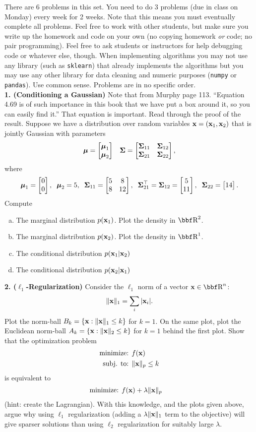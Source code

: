 \documentclass[12pt,letterpaper,fleqn]{hmcpset}
\begin{document}
There are 6 problems in this set. You need to do 3 problems (due in class on Monday)
every week for 2 weeks. Note that this means you must eventually complete all problems.
Feel free to work with other students, but make sure you write up the homework
and code on your own (no copying homework \textit{or} code; no pair programming).
Feel free to ask students or instructors for help debugging code or whatever else,
though.
When implementing algorithms you may not use any library (such as \texttt{sklearn})
that already implements the algorithms but you may use any other library for
data cleaning and numeric purposes (\texttt{numpy} or \texttt{pandas}). Use common
sense. Problems are in no specific order.\\[1em]

\textbf{1. (Conditioning a Gaussian)} Note that from Murphy page 113. ``Equation 4.69
is of such importance in this book that we have put a box around it, so you can easily
find it.'' That equation is important. Read through the proof of the result.
Suppose we have a distribution over random variables ${\bf x} = ({\bf x}_1, {\bf x}_2)$ that is
jointly Gaussian with parameters
\[
    \hbox{\boldmath$\mu$} = \begin{bmatrix} \hbox{\boldmath$\mu$}_1\\\hbox{\boldmath$\mu$}_2 \end{bmatrix}\;\;\; \hbox{\boldmath$\Sigma$} = \begin{bmatrix} \hbox{\boldmath$\Sigma$}_{11}&\hbox{\boldmath$\Sigma$}_{12}\\\hbox{\boldmath$\Sigma$}_{21}&\hbox{\boldmath$\Sigma$}_{22} \end{bmatrix},
\]
where
\[
    \hbox{\boldmath$\mu$}_1 = \begin{bmatrix} 0\\0 \end{bmatrix}, \;\; \hbox{\boldmath$\mu$}_2 = 5, \;\; \hbox{\boldmath$\Sigma$}_{11} = \begin{bmatrix} 5 & 8\\ 8 & 12 \end{bmatrix}, \;\; \hbox{\boldmath$\Sigma$}_{21}^\top = \hbox{\boldmath$\Sigma$}_{12} = \begin{bmatrix} 5\\11 \end{bmatrix}, \;\; \hbox{\boldmath$\Sigma$}_{22} = \begin{bmatrix} 14 \end{bmatrix}.
\]
Compute
\begin{enumerate}[(a)]
    \item The marginal distribution $p({\bf x}_1)$. Plot the density in $\RR^2$.
    \item The marginal distribution $p({\bf x}_2)$. Plot the density in $\RR^1$.
    \item The conditional distribution $p({\bf x}_1 | {\bf x}_2)$
    \item The conditional distribution $p({\bf x}_2 | {\bf x}_1)$\\[1em]
\end{enumerate}

\textbf{2. ($\ell_1$-Regularization)} Consider the $\ell_1$ norm of a vector $\xx\in\RR^n$:
\[
    \|{\bf x}\|_1 = \sum_i |{\bf x}_i|.
\]
Plot the norm-ball $B_k = \{{\bf x} : \|{\bf x}\|_1 \leq k\}$ for $k=1$. On the same plot, plot
the Euclidean norm-ball $A_k = \{{\bf x} : \|{\bf x}\|_2 \leq k\}$ for $k=1$ behind the first plot.
Show that the optimization problem
\begin{align*}
    \text{minimize: } & f({\bf x})\\
    \text{subj. to: } & \|{\bf x}\|_p \leq k
\end{align*}
is equivalent to
\begin{align*}
    \text{minimize: } & f({\bf x}) + \lambda\|{\bf x}\|_p
\end{align*}
(hint: create the Lagrangian). With this knowledge, and the plots given above, argue why
using $\ell_1$ regularization (adding a $\lambda\|{\bf x}\|_1$ term to the objective) will give
sparser solutions than using $\ell_2$ regularization for suitably large $\lambda$.\\[1em]
\end{document}
